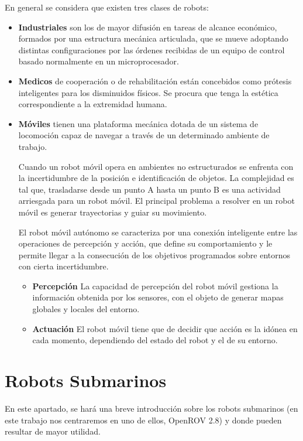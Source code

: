 En general se considera que existen tres clases de robots:
\begin{itemize}
\item \textbf{Industriales} son los de mayor difusión en tareas de alcance económico, formados por una estructura mecánica articulada, que se mueve adoptando distintas configuraciones por las órdenes recibidas de un equipo de control basado normalmente en un microprocesador.
\item \textbf{Medicos}  de cooperación o de rehabilitación están concebidos como prótesis inteligentes para los disminuidos físicos. Se procura que tenga la estética correspondiente a la extremidad humana.
\item \textbf{Móviles} tienen una plataforma mecánica dotada de un sistema de locomoción capaz de navegar a través de un determinado ambiente de trabajo.

Cuando un robot móvil opera en ambientes no estructurados se enfrenta con la incertidumbre de la posición e identificación de objetos. La complejidad es tal que, trasladarse desde un punto A hasta un punto B es una actividad arriesgada para un robot móvil.
El principal problema a resolver en un robot móvil es generar trayectorias y guiar su movimiento.

El robot móvil autónomo se caracteriza por una conexión inteligente entre las operaciones de percepción y acción, que define su comportamiento y le permite llegar a la consecución de los objetivos programados sobre entornos con cierta incertidumbre.
  \begin{itemize}
  \item \textbf{Percepción} La capacidad de percepción del robot móvil gestiona la información obtenida por los sensores, con el objeto de generar mapas globales y locales del entorno. 
  \item \textbf{Actuación}  El robot móvil tiene que de decidir que acción es la idónea en cada momento, dependiendo del estado del robot y el de su entorno.
  \end{itemize}
\end{itemize}


\section{Robots Submarinos}
\label{cap:Robots Submarinos}
En este apartado, se hará una breve introducción sobre los robots submarinos (en este trabajo nos centraremos en uno de ellos, OpenROV 2.8) y donde pueden resultar de mayor utilidad.

